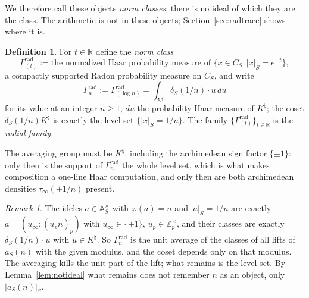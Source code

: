 \documentclass[11pt]{amsart}
\theoremstyle{definition}
\newtheorem{definition}[theorem]{Definition}
\theoremstyle{remark}
\newtheorem{remark}[theorem]{Remark}
\newcommand{\R}{\mathbb R}
\newcommand{\Z}{\mathbb Z}
\newcommand{\A}{\mathbb A}
\newcommand{\Knat}{K^{\natural}}
\begin{document}
We therefore call these objects \emph{norm classes}; there is no ideal of which
they are the class.  The arithmetic is not in these objects;
Section~\ref{sec:radtrace} shows where it is.

\begin{definition}\label{def:normclass}
For $t\in\R$ define the \emph{norm class}
\begin{equation}\label{eq:normclass}
  \Gamma^{\mathrm{rad}}_{(t)}:=\text{the normalized Haar probability measure
   of }\{x\in C_S:|x|_S=e^{-t}\},
\end{equation}
a compactly supported Radon probability measure on $C_S$, and write
\begin{equation}\label{eq:normclassn}
  \Gamma_n^{\mathrm{rad}}:=\Gamma^{\mathrm{rad}}_{(\log n)}
   =\int_{\Knat}\delta_S(1/n)\cdot u\,du
\end{equation}
for its value at an integer $n\ge1$, $du$ the probability Haar measure of
$\Knat$; the coset $\delta_S(1/n)\Knat$ is exactly the level set
$\{|x|_S=1/n\}$. The family $\{\Gamma^{\mathrm{rad}}_{(t)}\}_{t\in\R}$ is the
\emph{radial family}.
\end{definition}

The averaging group must be $\Knat$, including the archimedean sign factor
$\{\pm1\}$: only then is the support of $\Gamma_n^{\mathrm{rad}}$ the whole
level set, which is what makes composition a one-line Haar computation, and
only then are both archimedean densities $\tau_\infty(\pm1/n)$ present.

\begin{remark}\label{rem:whatthecosetis}
The ideles $a\in\A_S^\times$ with $\varphi(a)=n$ and $|a|_S=1/n$ are exactly
$a=(u_\infty;(u_pn)_p)$ with $u_\infty\in\{\pm1\}$, $u_p\in\Z_p^\times$, and
their classes are exactly $\delta_S(1/n)\cdot u$ with $u\in\Knat$. So
$\Gamma_n^{\mathrm{rad}}$ is the unit average of the classes of all lifts of
$a_S(n)$ with the given modulus, and the coset depends only on that modulus.
The averaging kills the unit part of the lift; what remains is the level set.
By Lemma~\ref{lem:notideal} what remains does not remember $n$ as an object,
only $|a_S(n)|_S$.
\end{remark}
\end{document}
